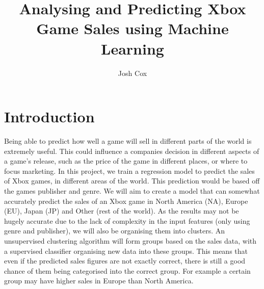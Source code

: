 \documentclass[english]{article}
\begin{document}
\title{\bf Analysing and Predicting Xbox Game Sales using Machine Learning}

\author{Josh Cox}

\date{}
\maketitle
\thispagestyle{fancy}

\section{Introduction}

Being able to predict how well a game will sell in different parts of the world is extremely useful. This could influence a companies decision in different aspects of a game's release, such as the price of the game in different places, or where to focus marketing. In this project, we train a regression model to predict the sales of Xbox games, in different areas of the world. This prediction would be based off the games publisher and genre. We will aim to create a model that can somewhat accurately predict the sales of an Xbox game in North America (NA), Europe (EU), Japan (JP) and Other (rest of the world). As the results may not be hugely accurate due to the lack of complexity in the input features (only using genre and publisher), we will also be organising them into clusters. An unsupervised clustering algorithm will form groups based on the sales data, with a supervised classifier organising new data into these groups. This means that even if the predicted sales figures are not exactly correct, there is still a good chance of them being categorised into the correct group. For example a certain group may have higher sales in Europe than North America.
\end{document}
